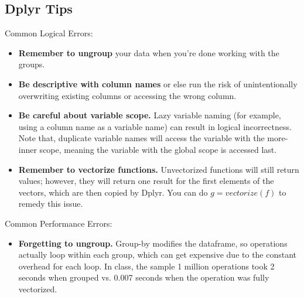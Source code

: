 \subsection{Dplyr Tips}
Common Logical Errors:\\
\begin{itemize}
\item \textbf{Remember to ungroup} your data when you're done working with the groups.
\item \textbf{Be descriptive with column names} or else run the risk of unintentionally overwriting existing columns or accessing the wrong column.
\item \textbf{Be careful about variable scope.} Lazy variable naming (for example, using a column name as a variable name) can result in logical incorrectness. Note that, duplicate variable names will access the variable with the more-inner scope, meaning the variable with the global scope is accessed last. 
\item \textbf{Remember to vectorize functions.} Unvectorized functions will still return values; however, they will return one result for the first elements of the vectors, which are then copied by Dplyr. You can do $g = vectorize(f)$ to remedy this issue. 
\end{itemize}
Common Performance Errors:\\
\begin{itemize}
\item \textbf{Forgetting to ungroup.} Group-by modifies the dataframe, so operations actually loop within each group, which can get expensive due to the constant overhead for each loop. In class, the sample 1 million operations took 2 seconds when grouped vs. 0.007 seconds when the operation was fully vectorized. 
\end{itemize}

